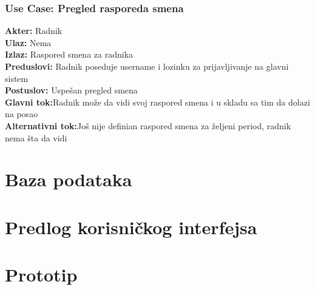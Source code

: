 \documentclass{article}
\begin{document}
\subsubsection{\textbf{Use Case}: Pregled rasporeda smena}
\textbf{Akter:} Radnik\\
\textbf{Ulaz:} Nema\\
\textbf{Izlaz:} Raspored smena za radnika\\
\textbf{Preduslovi:} Radnik poseduje username i lozinku za prijavljivanje na glavni sistem\\
\textbf{Postuslov:} Uspešan pregled smena\\
\textbf{Glavni tok:}Radnik može da vidi svoj raspored smena i u skladu sa tim da dolazi na posao\\
\textbf{Alternativni tok:}Još nije definian raspored smena za željeni period, radnik nema šta da vidi\\
\section{Baza podataka}
\section{Predlog korisničkog interfejsa}
\section{Prototip}
\end{document}
